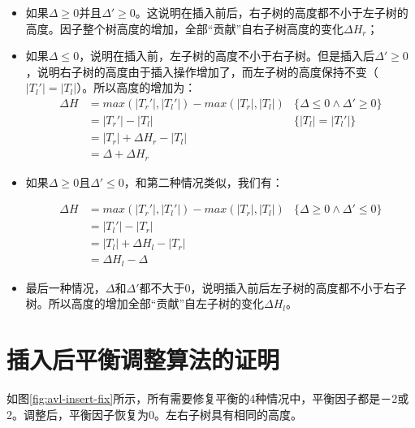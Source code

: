 \documentclass{ctexart}
\begin{document}
\begin{itemize}
\item 如果$\Delta \geq 0$并且$\Delta' \geq 0$。这说明在插入前后，右子树的高度都不小于左子树的高度。因子整个树高度的增加，全部“贡献”自右子树高度的变化$\Delta H_r$；

\item 如果$\Delta \leq 0$，说明在插入前，左子树的高度不小于右子树。但是插入后$\Delta' \geq 0$，说明右子树的高度由于插入操作增加了，而左子树的高度保持不变（$|T_l'|=|T_l|$）。所以高度的增加为：
\[
\begin{array}{rll}
\Delta H & = max(|T_r'|, |T_l'|) - max (|T_r|, |T_l|) & \{\Delta \leq 0 \land \Delta' \geq 0 \}\\
         & = |T_r'|-|T_l| & \{|T_l|=|T_l'| \}\\
         & = |T_r|+\Delta H_r - |T_l| & \\
         & = \Delta + \Delta H_r &
\end{array}
\]

\item 如果$\Delta \geq 0$且$\Delta' \leq 0$，和第二种情况类似，我们有：

\[
\begin{array}{rll}
\Delta H & = max(|T_r'|, |T_l'|) - max (|T_r|, |T_l|) & \{\Delta \geq 0 \land \Delta' \leq 0 \}\\
         & = |T_l'|-|T_r| & \\
         & = |T_l|+\Delta H_l - |T_r| & \\
         & = \Delta H_l - \Delta&
\end{array}
\]

\item 最后一种情况，$\Delta$和$\Delta'$都不大于0，说明插入前后左子树的高度都不小于右子树。所以高度的增加全部“贡献”自左子树的变化$\Delta H_l$。
\end{itemize}

\section{插入后平衡调整算法的证明}

如图\ref{fig:avl-insert-fix}所示，所有需要修复平衡的4种情况中，平衡因子都是－2或2。调整后，平衡因子恢复为0。左右子树具有相同的高度。
\end{document}
